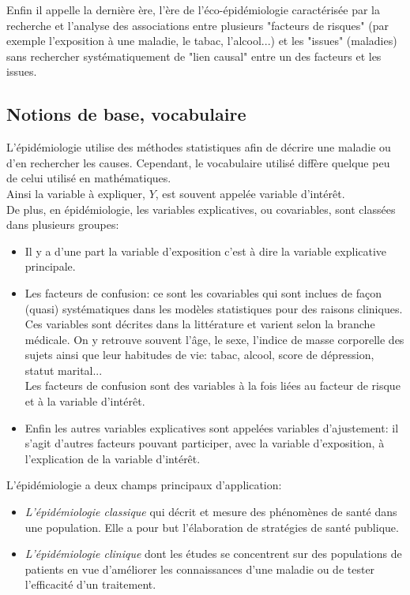 \documentclass{book}
\begin{document}
\noindent
Enfin il appelle la dernière ère, l'ère de l'éco-épidémiologie caractérisée par la recherche et l'analyse des associations entre plusieurs "facteurs de risques" (par exemple l'exposition à une maladie, le tabac, l'alcool...) et les "issues" (maladies) sans rechercher systématiquement de "lien causal" entre un des facteurs et les issues.\\


\subsection{Notions de base, vocabulaire}

\noindent
L'épidémiologie utilise des méthodes statistiques afin de décrire une maladie ou d'en rechercher les causes. Cependant, le vocabulaire utilisé diffère quelque peu de celui utilisé en mathématiques.\\
Ainsi la variable à expliquer, $Y$, est souvent appelée variable d'intérêt. \\

\noindent
De plus, en épidémiologie, les variables explicatives, ou covariables, sont classées dans plusieurs groupes:

\begin{itemize}
\item Il y a d'une part la variable d'exposition c'est à dire la variable explicative principale. 
\item Les facteurs de confusion: ce sont les covariables qui sont inclues de façon (quasi) systématiques dans les modèles statistiques pour des raisons cliniques. Ces variables sont décrites dans la littérature et varient selon la branche médicale. On y retrouve souvent l'âge, le sexe, l'indice de masse corporelle des sujets ainsi que leur habitudes de vie: tabac, alcool, score de dépression, statut marital...\\
Les facteurs de confusion sont des variables à la fois liées au facteur de risque et à la variable d'intérêt.
\item Enfin les autres variables explicatives sont appelées variables d'ajustement: il s'agit d'autres facteurs pouvant participer, avec la variable d'exposition, à l'explication de la variable d'intérêt.
\end{itemize} 

\bigskip 

\noindent
L'épidémiologie a deux champs principaux d'application:
\begin{itemize}
\item \textit{L'épidémiologie classique} qui décrit et mesure des phénomènes de santé dans une population. Elle a pour but l'élaboration de stratégies de santé publique.
\item \textit{L'épidémiologie clinique} dont les études se concentrent sur des populations de patients en vue d'améliorer les connaissances d'une maladie ou de tester l'efficacité d'un traitement.
\end{itemize}
\end{document}
